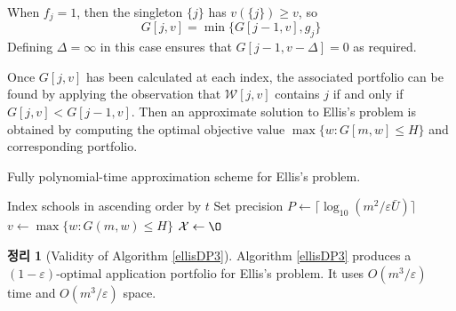 \documentclass[12pt]{article} %
\newtheorem{theorem}{Theorem}
\theoremstyle{definition}
\newtheorem{theorem}{정리}
\theoremstyle{definition}
\begin{document}
When $f_j = 1$, then the singleton $\{j\}$ has $v(\{j\}) \geq v$, so
\begin{equation}G[j, v] = \min\bigl\{G[j-1, v], g_j \bigr\}\end{equation}
Defining $\Delta = \infty$ in this case ensures that $G[j-1, v-\Delta] = 0$ as required.
%

Once $G[j, v]$ has been calculated at each index, the associated portfolio can be found by applying the observation that $\mathcal{W}[j, v]$ contains $j$ if and only if $G[j, v] < G[j-1, v]$. Then an approximate solution to Ellis's problem is obtained by computing the optimal objective value $\max\{ w: G[m, w] \leq H\}$ and corresponding portfolio.

\begin{algorithm}[H] 
\caption{Fully polynomial-time approximation scheme for Ellis's problem.} \label{ellisDP3}
\KwData{Utility values $t \in \mathbb{N}^m$, admissions probabilities $f \in (0, 1]^m$, application costs $g \in (0, \infty)^m$, budget $H \in (0, \infty)^m$, tolerance $\varepsilon \in (0, 1)$.}
Index schools in ascending order by $t$\;
Set precision $P \gets \bigl\lceil\log_{10}\left(m^2 / \varepsilon \bar U\right)\bigr\rceil$\;
$v\gets  \max\{ w: G(m, w) \leq H\}$\; \label{vrecordedhere}
$\mathcal{X} \gets \O$\;
\end{algorithm}

\begin{theorem}[Validity of Algorithm \ref{ellisDP3}]
Algorithm \ref{ellisDP3} produces a $(1 - \varepsilon)$-optimal application portfolio for Ellis's problem. It uses $O(m^3 /\varepsilon)$ time and $O(m^3/\varepsilon)$ space.
\end{theorem}
\end{document}
